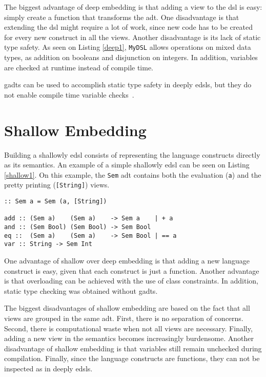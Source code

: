 The biggest advantage of deep embedding is that adding a view to the \ac{dsl} is easy: simply create a function that transforms the \ac{adt}. One disadvantage is that extending the \ac{dsl} might require a lot of work, since new code has to be created for every new construct in all the views. Another disadvantage is its lack of static type safety. As seen on Listing \ref{deep1}, \texttt{MyDSL} allows operations on mixed data types, as addition on booleans and disjunction on integers. In addition, variables are checked at runtime instead of compile time.

\acp{gadt} can be used to accomplish static type safety in deeply \acp{edsl}, but they do not enable compile time variable checks~\cite{gadts}. 

\section{Shallow Embedding}
Building a shallowly \ac{edsl} consists of representing the language constructs directly as its semantics. An example of a simple shallowly \ac{edsl} can be seen on Listing \ref{shallow1}. On this example, the \texttt{Sem} \ac{adt} contains both the evaluation (\texttt{a}) and the pretty printing (\texttt{[String]}) views.

\begin{lstlisting}[caption=A simple shallowly \ac{edsl},captionpos=b,label=shallow1]
:: Sem a = Sem (a, [String])

add :: (Sem a)    (Sem a)    -> Sem a    | + a
and :: (Sem Bool) (Sem Bool) -> Sem Bool
eq ::  (Sem a)    (Sem a)    -> Sem Bool | == a
var :: String -> Sem Int
\end{lstlisting}

One advantage of shallow over deep embedding is that adding a new language construct is easy, given that each construct is just a function. Another advantage is that overloading can be achieved with the use of class constraints. In addition, static type checking was obtained without \acp{gadt}. 

The biggest disadvantages of shallow embedding are based on the fact that all views are grouped in the same \ac{adt}. First, there is no separation of concerns. Second, there is computational waste when not all views are necessary. Finally, adding a new view in the semantics becomes increasingly burdensome. Another disadvantage of shallow embedding is that variables still remain unchecked during compilation. Finally, since the language constructs are functions, they can not be inspected as in deeply \acp{edsl}.

